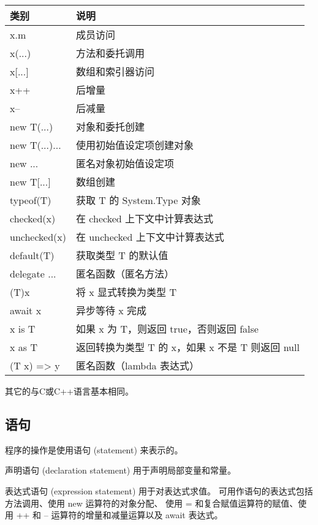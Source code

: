 \begin{tabular}{|l|l|}
\hline
类别            & 说明 \\
\hline
x.m            &          成员访问  \\
x(...)         &           方法和委托调用  \\
x[...]         &           数组和索引器访问  \\
x++            &        后增量  \\
x--            &           后减量  \\
new T(...)     &       对象和委托创建  \\
new T(...){...}&      使用初始值设定项创建对象  \\
new {...}      &         匿名对象初始值设定项  \\
new T[...]     &        数组创建  \\
typeof(T)      &      获取 T 的 System.Type 对象  \\
checked(x)     &    在 checked 上下文中计算表达式  \\
unchecked(x)   & 在 unchecked 上下文中计算表达式  \\
default(T)     &       获取类型 T 的默认值  \\
delegate {...} &      匿名函数（匿名方法）  \\
(T)x           &             将 x 显式转换为类型 T  \\
await x        &         异步等待 x 完成  \\
x is T         &            如果 x 为 T，则返回 true，否则返回 false  \\
x as T         &           返回转换为类型 T 的 x，如果 x 不是 T 则返回 null  \\
(T x) => y     &       匿名函数（lambda 表达式）  \\
\hline
\end{tabular}

其它的与C或C++语言基本相同。

\subsection{ 语句 }
程序的操作是使用语句 (statement) 来表示的。

声明语句 (declaration statement) 用于声明局部变量和常量。

表达式语句 (expression statement) 用于对表达式求值。
可用作语句的表达式包括方法调用、使用 new 运算符的对象分配、
使用 = 和复合赋值运算符的赋值、使用 ++ 和 -- 运算符的增量和减量运算以及 await 表达式。

